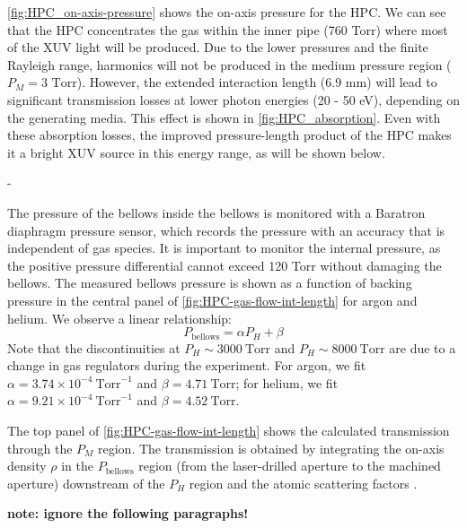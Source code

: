 
\cref{fig:HPC_on-axis-pressure} shows the on-axis pressure for the HPC. We can see that the HPC concentrates the gas within the inner pipe (760 Torr) where most of the XUV light will be produced. Due to the lower pressures and the finite Rayleigh range, harmonics will not be produced in the medium pressure region ($P_M = 3 \textrm{ Torr}$). However, the extended interaction length (6.9 mm) will lead to significant transmission losses at lower photon energies (20 - 50 eV), depending on the generating media. This effect is shown in \cref{fig:HPC_absorption}. Even with these absorption losses, the improved pressure-length product of the HPC makes it a bright XUV source in this energy range, as will be shown below.

- 

The pressure of the bellows inside the bellows is monitored with a Baratron diaphragm pressure sensor, which records the pressure with an accuracy that is independent of gas species. It is important to monitor the internal pressure, as the positive pressure differential cannot exceed 120 Torr without damaging the bellows. The measured bellows pressure is shown as a function of backing pressure in the central panel of \cref{fig:HPC-gas-flow-int-length} for argon and helium. We observe a linear relationship:
\begin{equation}
P_{\textrm{bellows}} = \alpha P_H + \beta
\end{equation}
Note that the discontinuities at $P_H \sim 3000 \ \textrm{Torr}$ and $P_H \sim 8000 \ \textrm{Torr}$ are due to a change in gas regulators during the experiment. For argon, we fit $\alpha = 3.74 \times 10^{-4} \ \textrm{Torr}^{-1}$ and $\beta = 4.71 \ \textrm{Torr}$; for helium, we fit $\alpha = 9.21 \times 10^{-4} \ \textrm{Torr}^{-1}$ and $\beta = 4.52 \ \textrm{Torr}$.

The top panel of \cref{fig:HPC-gas-flow-int-length} shows the calculated transmission through the $P_M$ region. The transmission is obtained by integrating the on-axis density $\rho$ in the $P_{\textrm{bellows}}$ region (from the laser-drilled aperture to the machined aperture) downstream of the $P_H$ region and the atomic scattering factors \cite{gulliksonCXROXRayInteractions}.



\textbf{note: ignore the following paragraphs!}

